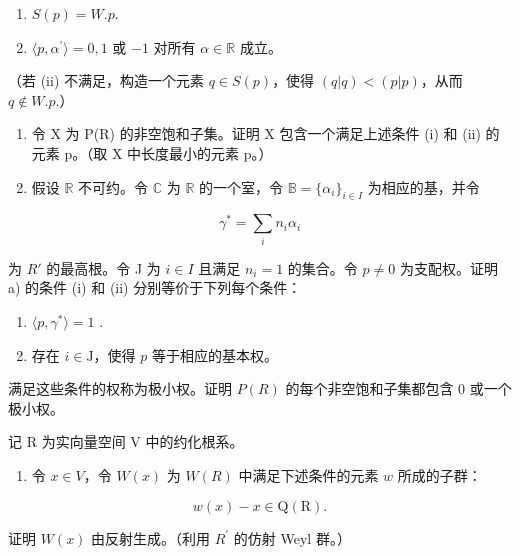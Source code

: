 \begin{enumerate}
\def\labelenumi{(\roman{enumi})}
\item
  \(S(p) = W.p.\)
\item
  \(\langle p, \alpha^{\prime} \rangle = 0, 1\) 或 \(-1\) 对所有 \(\alpha \in \mathbb{R}\) 成立。
\end{enumerate}

（若 (ii) 不满足，构造一个元素 \(q \in S(p)\)，使得 \((q|q) < (p|p)\)，从而 \(q \notin W.p.\)）

\begin{enumerate}
\def\labelenumi{\alph{enumi})}
\setcounter{enumi}{1}
\item
  令 X 为 P(R) 的非空饱和子集。证明 X 包含一个满足上述条件 (i) 和 (ii) 的元素 p。（取 X 中长度最小的元素 p。）
\item
  假设 \(\mathbb{R}\) 不可约。令 \(\mathbb{C}\) 为 \(\mathbb{R}\) 的一个室，令 \(\mathbb{B} = \{\alpha_i\}_{i\in I}\) 为相应的基，并令
\end{enumerate}

\[
\gamma^ {*} = \sum_ {i} n _ {i} \alpha_ {i}
\]

为 \(R'\) 的最高根。令 J 为 \(i \in I\) 且满足 \(n_{i} = 1\) 的集合。令 \(p \neq 0\) 为支配权。证明 a) 的条件 (i) 和 (ii) 分别等价于下列每个条件：

\begin{enumerate}
\def\labelenumi{(\roman{enumi})}
\setcounter{enumi}{2}
\item
  \(\langle p, \gamma^{*} \rangle = 1\) .
\item
  存在 \(i \in \mathrm{J}\)，使得 \(p\) 等于相应的基本权。
\end{enumerate}

满足这些条件的权称为极小权。证明 \(P(R)\) 的每个非空饱和子集都包含 0 或一个极小权。


记 R 为实向量空间 V 中的约化根系。

\begin{enumerate}
\def\labelenumi{\arabic{enumi})}
\tightlist
\item
  令 \(x \in V\)，令 \(W(x)\) 为 \(W(R)\) 中满足下述条件的元素 \(w\) 所成的子群：
\end{enumerate}

\[
w (x) - x \in \mathrm{Q} (\mathrm{R}).
\]

证明 \(W(x)\) 由反射生成。（利用 \(R^{\prime}\) 的仿射 Weyl 群。）

